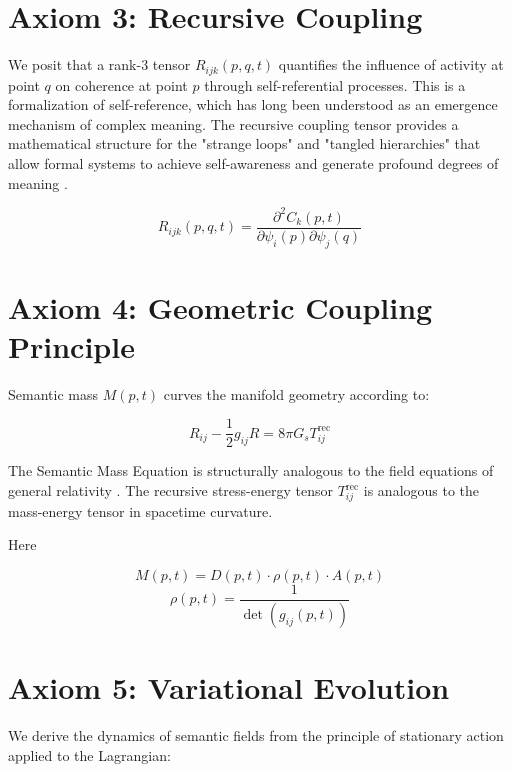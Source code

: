 \section{Axiom 3: Recursive Coupling}

We posit that a rank-3 tensor \(R_{ijk}(p,q,t)\) quantifies the influence of activity at point \(q\) on coherence at point \(p\) through self-referential processes. This is a formalization of self-reference, which has long been understood as an emergence mechanism of complex meaning. The recursive coupling tensor provides a mathematical structure for the "strange loops" and "tangled hierarchies" that allow formal systems to achieve self-awareness and generate profound degrees of meaning \autocite{Hofstadter1979}.

\begin{equation}
R_{ijk}(p,q,t) = \frac{\partial^2 C_k(p,t)}{\partial \psi_i(p) \partial \psi_j(q)}
\end{equation}

\section{Axiom 4: Geometric Coupling Principle}

Semantic mass \(M(p,t)\) curves the manifold geometry according to:

\begin{equation}
R_{ij} - \frac{1}{2}g_{ij}R = 8\pi G_s T^{\text{rec}}_{ij}
\end{equation}

The Semantic Mass Equation is structurally analogous to the field equations of general relativity \autocite{Einstein1915, MisnerThorneWheeler1973, Wald1984}. The recursive stress-energy tensor \(T^{\text{rec}}_{ij}\) is analogous to the mass-energy tensor in spacetime curvature.

Here

\begin{equation}
M(p,t) = D(p,t) \cdot \rho(p,t) \cdot A(p,t)
\end{equation}
\begin{equation}
\rho(p,t) = \frac{1}{\det(g_{ij}(p,t))}
\end{equation}

\section{Axiom 5: Variational Evolution}

We derive the dynamics of semantic fields from the principle of stationary action applied to the Lagrangian:

